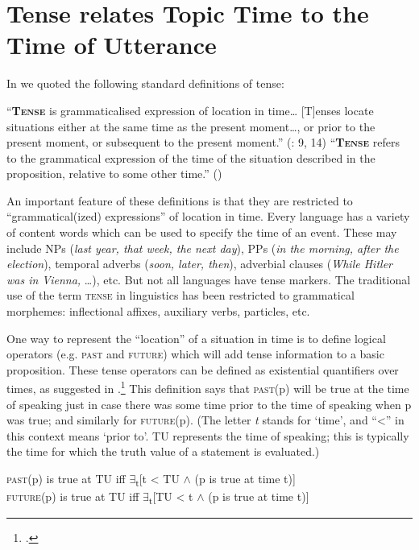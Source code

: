 \section{Tense relates Topic Time to the Time of Utterance}\label{sec:21.2}

In  we quoted the following standard definitions of tense:


\ea \label{ex:21.2}
\ea   “\textbf{\textsc{Tense}} is grammaticalised expression of location in time… [T]enses locate situations either at the same time as the present moment…, or prior to the present moment, or subsequent to the present moment.” (\citealt{Comrie1985}: 9, 14)
\ex   “\textbf{\textsc{Tense}} refers to the grammatical expression of the time of the situation described in the proposition, relative to some other time.” (\citealt[144]{Bybee1992})
\z \z


An important feature of these definitions is that they are restricted to “grammatical(ized) expressions” of location in time. Every language has a variety of content words which can be used to specify the time of an event. These may include NPs (\textit{last year, that week, the next day}), PPs (\textit{in the morning, after the election}), temporal adverbs (\textit{soon, later, then}), adverbial clauses (\textit{While Hitler was in Vienna,} …), etc. But not all languages have tense markers. The traditional use of the term \textsc{tense} in linguistics has been restricted to grammatical morphemes: inflectional affixes, auxiliary verbs, particles, etc.



One way to represent the “location” of a situation in time is to define logical operators (e.g. \textsc{past} and \textsc{future}) which will add tense information to a basic proposition. These tense operators can be defined as existential quantifiers over times, as suggested in .\footnote{\citet{Prior1957,Prior1967}.} This definition says that \textsc{past}(p) will be true at the time of speaking just in case there was some time prior to the time of speaking when p was true; and similarly for \textsc{future}(p). (The letter \textit{t} stands for ‘time’, and “<” in this context means ‘prior to’. TU represents the time of speaking; this is typically the time for which the truth value of a statement is evaluated.)


\ea \label{ex:21.3}
\textsc{past}(p) is true at TU  iff  ${\exists}$\textsubscript{t}[t < TU $\wedge$ (p is true at time t)]\\
\textsc{future}(p) is true at TU  iff  ${\exists}$\textsubscript{t}[TU < t $\wedge$ (p is true at time t)]
\z


